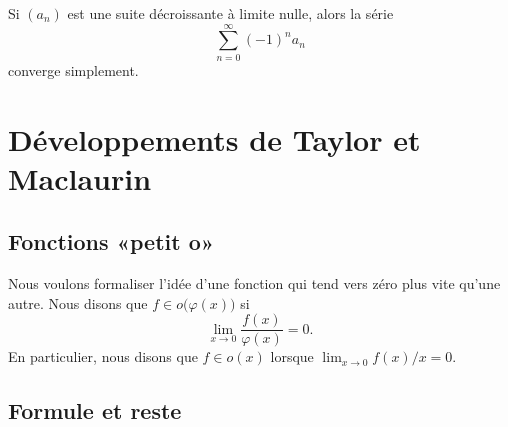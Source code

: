\begin{corollary}       \label{CoreMjIfw}
    Si \( (a_n)\) est une suite décroissante à limite nulle, alors la série
  \begin{equation}
    \sum_{n=0}^\infty {(-1)}^n a_n
  \end{equation}
  converge simplement.
\end{corollary}

					\section{Développements de Taylor et Maclaurin}

\subsection{Fonctions «petit o» }

Nous voulons formaliser l'idée d'une fonction qui tend vers zéro \og plus vite\fg{} qu'une autre. Nous disons que $f\in o\big(\varphi(x)\big)$ si
\begin{equation}
	\lim_{x\to 0} \frac{ f(x) }{ \varphi(x) }=0.
\end{equation}
En particulier, nous disons que $f\in o(x)$ lorsque $\lim_{x\to 0} f(x)/x=0$.

\subsection{Formule et reste}

